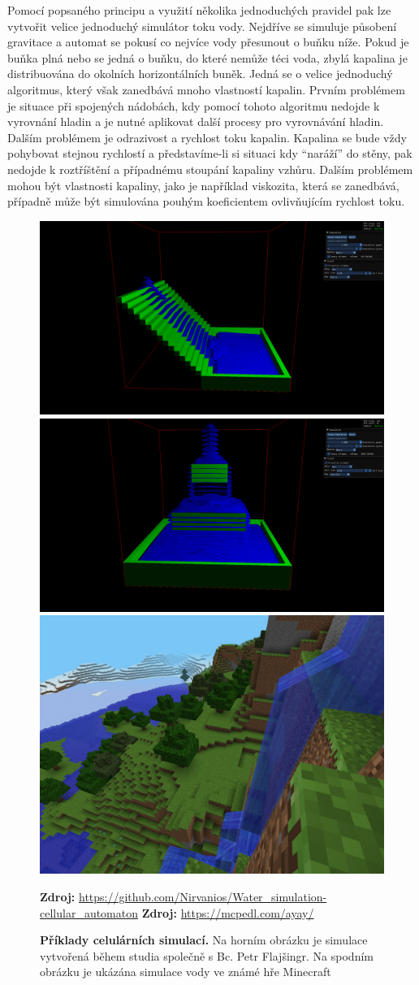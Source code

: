Pomocí popsaného principu a využití několika jednoduchých pravidel pak lze vytvořit velice jednoduchý simulátor toku vody. Nejdříve se simuluje působení gravitace a automat se pokusí co nejvíce vody přesunout o buňku níže. Pokud je buňka plná nebo se jedná o buňku, do které nemůže téci voda, zbylá kapalina je distribuována do okolních horizontálních buněk. Jedná se o velice jednoduchý algoritmus, který však zanedbává mnoho vlastností kapalin. Prvním problémem je situace při spojených nádobách, kdy pomocí tohoto algoritmu nedojde k vyrovnání hladin a je nutné aplikovat další procesy pro vyrovnávání hladin. Dalším problémem je odrazivost a rychlost toku kapalin. Kapalina se bude vždy pohybovat stejnou rychlostí a představíme-li si situaci kdy \enquote{naráží} do stěny, pak nedojde k roztříštění a případnému stoupání kapaliny vzhůru. Dalším problémem mohou být vlastnosti kapaliny, jako je například viskozita, která se zanedbává, případně může být simulována pouhým koeficientem ovlivňujícím rychlost toku. \cite{Medvecky-Heretik2018thesis}

\begin{figure}[h]\centering
  \centering
  \captionsetup{justification=centering}
	\includegraphics[width=0.5\linewidth]{obrazky-figures/cellular1.png}\hfill
	\includegraphics[width=0.5\linewidth]{obrazky-figures/cellular2.png}\hfill
	\includegraphics[width=0.5\linewidth]{obrazky-figures/miecraft.jpg}\hfill
  \caption{\textbf{Příklady celulárních simulací.} Na horním obrázku je simulace vytvořená během studia společně s Bc. Petr Flajšingr. Na spodním obrázku je ukázána simulace vody ve známé hře Minecraft}
  \textbf{Zdroj: } \url{https://github.com/Nirvanios/Water_simulation-cellular_automaton}
  \textbf{Zdroj: } \url{https://mcpedl.com/ayay/}
  \label{fig:SWE}
\end{figure}


